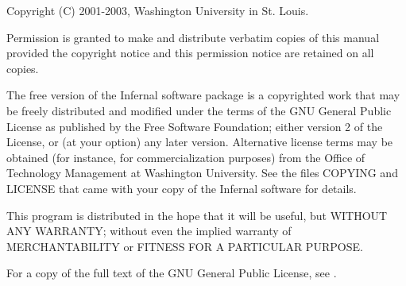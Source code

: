 \vspace*{\fill}
\begin{flushleft}
Copyright (C) 2001-2003, Washington University in St. Louis.\vspace{5mm}

Permission is granted to make and distribute verbatim copies of this
manual provided the copyright notice and this permission notice are
retained on all copies.\vspace{5mm}

The free version of the Infernal software package is a copyrighted
work that may be freely distributed and modified under the terms of
the GNU General Public License as published by the Free Software
Foundation; either version 2 of the License, or (at your option) any
later version. Alternative license terms may be obtained (for
instance, for commercialization purposes) from the Office of
Technology Management at Washington University. See the files COPYING
and LICENSE that came with your copy of the Infernal software for
details.\vspace{5mm}

This program is distributed in the hope that it will be useful, but
WITHOUT ANY WARRANTY; without even the implied warranty of
MERCHANTABILITY or FITNESS FOR A PARTICULAR PURPOSE.\vspace{5mm}

For a copy of the full text of the GNU General Public License, see
.
\vspace{5mm}

\end{flushleft}
